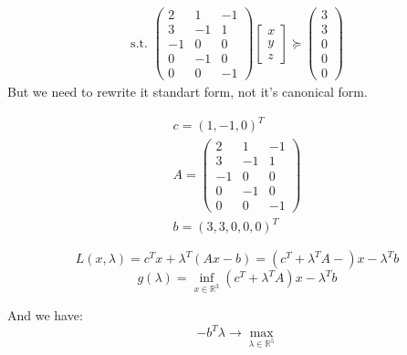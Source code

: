 \begin{equation*}
\begin{gathered}
    \text{s.t. } 
    \begin{pmatrix}
    2  & 1  & -1 \\
    3  & -1 & 1 \\
    -1 & 0  & 0 \\
    0  & -1 & 0 \\
    0  & 0  & -1 
    \end{pmatrix} 
    \begin{bmatrix}
    x \\
    y \\
    z
    \end{bmatrix} \succcurlyeq \begin{pmatrix}
        3 \\
        3 \\
        0 \\
        0 \\
        0
    \end{pmatrix} 
\end{gathered}
\end{equation*}
But we need to rewrite it standart form, not it's canonical form.

\begin{equation*}
\begin{gathered}
    c = \left(1, -1, 0\right)^T \\
    A = \begin{pmatrix}
    2  & 1  & -1 \\
    3  & -1 & 1 \\
    -1 & 0  & 0 \\
    0  & -1 & 0 \\
    0  & 0  & -1 
    \end{pmatrix} \\
    b = \left(3, 3, 0, 0, 0\right)^T
\end{gathered}
\end{equation*}

\begin{equation*}
    L(x, \lambda) = c^Tx + \lambda^T(Ax - b) = (c^T + \lambda^TA-)x - \lambda^T b
\end{equation*}
\begin{equation*}
    g(\lambda) = \inf_{x \in \mathds{R}^3} \left(c^T + \lambda^TA \right)x - \lambda^T b
\end{equation*}

And we have: 
\begin{equation*}
    -b^T\lambda\rightarrow \max_{\lambda \in \mathds{R}^5}
\end{equation*}

